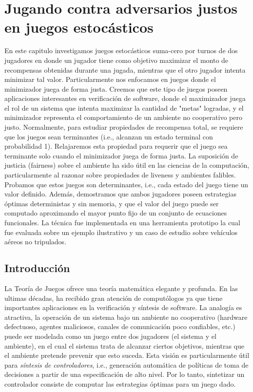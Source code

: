 \chapter{Jugando contra adversarios justos en juegos estocásticos}
\label{cap:fairAdversaries}

En este capitulo investigamos juegos estocásticos suma-cero por turnos de dos jugadores en donde un jugador tiene como objetivo maximizar el monto de recompensas obtenidas durante una jugada, mientras que el otro jugador intenta minimizar tal valor. Particularmente nos enfocamos en juegos donde el minimizador juega de forma justa. Creemos que este tipo de juegos poseen aplicaciones interesantes en verificación de software, donde el maximizador juega el rol de un sistema que intenta maximizar la cantidad de "metas" logradas, y el minimizador representa el comportamiento de un ambiente no cooperativo pero justo.
Normalmente, para estudiar propiedades de recompensa total, se requiere que los juegos sean terminantes (i.e., alcanzan un estado terminal con probabilidad 1). 
Relajaremos esta propiedad para requerir que el juego sea terminante solo cuando el minimizador juega de forma justa. La suposición de justicia (fairness) sobre el ambiente ha sido útil en las ciencias de la computación, particularmente al razonar sobre propiedades de liveness y ambientes falibles.
Probamos que estos juegos son determinantes, i.e., cada estado del juego tiene un valor definido. Además, demostramos que ambos jugadores poseen estrategias óptimas deterministas y sin memoria, y que el valor del juego puede ser computado aproximando el mayor punto fijo de un conjunto de ecuaciones funcionales. La técnica fue implementada en una herramienta prototipo la cual fue evaluada sobre un ejemplo ilustrativo y un caso de estudio sobre vehículos aéreos no tripulados.

\section{Introducción} \label{sec:intro}
	La Teoría de Juegos \cite{MorgensternNeuman42}  ofrece una teoría matemática elegante y profunda. 
	En las ultimas décadas, ha recibido gran atención de computólogos ya que tiene importantes aplicaciones en la verificación y síntesis de software. 
	La analogía es atractiva, la operación de un sistema bajo un ambiente no cooperativo (hardware defectuoso, agentes maliciosos, canales de comunicación poco confiables, etc.) puede ser modelada como un juego entre dos jugadores (el sistema y el ambiente), en el cual el sistema trata de alcanzar ciertos objetivos, mientras que el ambiente pretende prevenir que esto suceda. 
	Esta visión es particularmente útil para \emph{síntesis de controladores}, i.e., generación automática de políticas de toma de decisiones a partir de una especificación de alto nivel. 
	Por lo tanto, sintetizar un controlador consiste de computar las estrategias óptimas para un juego dado.
		
